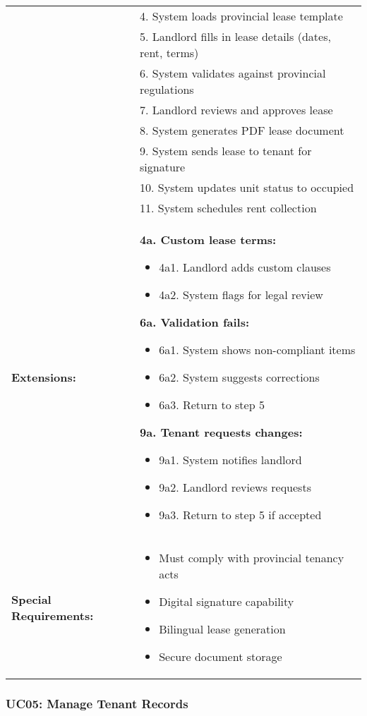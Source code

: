 \documentclass[12pt]{article}
\begin{document}
\begin{longtable}{|p{3cm}|p{11cm}|}
& 4. System loads provincial lease template \\
& 5. Landlord fills in lease details (dates, rent, terms) \\
& 6. System validates against provincial regulations \\
& 7. Landlord reviews and approves lease \\
& 8. System generates PDF lease document \\
& 9. System sends lease to tenant for signature \\
& 10. System updates unit status to occupied \\
& 11. System schedules rent collection \\
\hline
\textbf{Extensions:} & 
\textbf{4a. Custom lease terms:}
\begin{itemize}
    \item 4a1. Landlord adds custom clauses
    \item 4a2. System flags for legal review
\end{itemize}
\textbf{6a. Validation fails:}
\begin{itemize}
    \item 6a1. System shows non-compliant items
    \item 6a2. System suggests corrections
    \item 6a3. Return to step 5
\end{itemize}
\textbf{9a. Tenant requests changes:}
\begin{itemize}
    \item 9a1. System notifies landlord
    \item 9a2. Landlord reviews requests
    \item 9a3. Return to step 5 if accepted
\end{itemize} \\
\hline
\textbf{Special Requirements:} & 
\begin{itemize}
    \item Must comply with provincial tenancy acts
    \item Digital signature capability
    \item Bilingual lease generation
    \item Secure document storage
\end{itemize} \\
\hline
\end{longtable}

\subsubsection{UC05: Manage Tenant Records}
\end{document}
